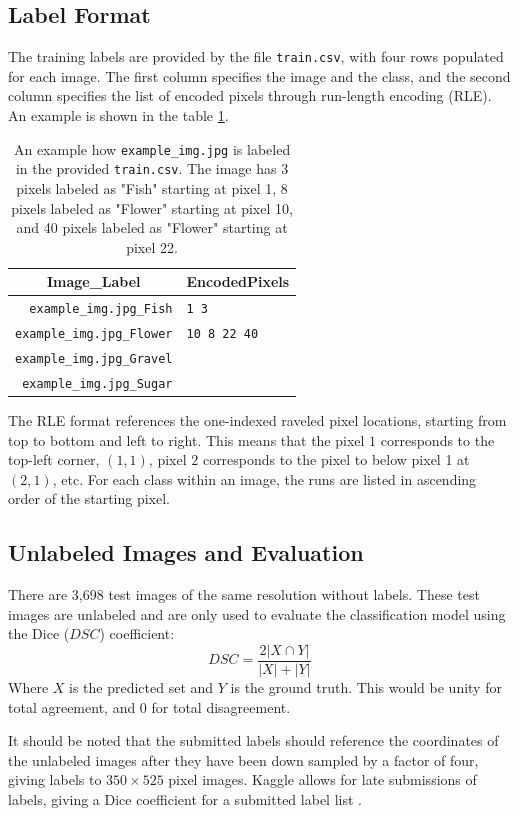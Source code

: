 \subsection*{Label Format}
The training labels are provided by the file \texttt{train.csv}, with four rows populated for each image. The first column specifies the image and the class, and the second column specifies the list of encoded pixels through run-length encoding (RLE). An example is shown in the table \cref{tab:RLE_ex}.
%
\begin{table}[h!]
    \centering
    \begin{tabular}{r|l}
    \multicolumn{1}{c|}{Image\_Label} & \multicolumn{1}{c}{EncodedPixels} \\ \hline
    \texttt{example\_img.jpg\_Fish}   & \texttt{1 3}        \\ \hline
    \texttt{example\_img.jpg\_Flower} & \texttt{10 8 22 40} \\ \hline
    \texttt{example\_img.jpg\_Gravel} &                                      \\ \hline
    \texttt{example\_img.jpg\_Sugar}  &                                     
    \end{tabular}
    \caption{An example how \texttt{example\_img.jpg} is labeled in the provided \texttt{train.csv}. The image has 3 pixels labeled as "Fish" starting at pixel 1, 8 pixels labeled as "Flower" starting at pixel 10, and 40 pixels labeled as "Flower" starting at pixel 22.}
    \label{tab:RLE_ex}
\end{table}

The RLE format references the one-indexed raveled pixel locations, starting from top to bottom and left to right. This means that the pixel \(1\) corresponds to the top-left corner, \((1,1)\), pixel \(2\) corresponds to the pixel to below pixel 1 at \((2, 1)\), etc. For each class within an image, the runs are listed in ascending order of the starting pixel. 
% 
\subsection*{Unlabeled Images and Evaluation} \label{eval}
There are 3,698 test images of the same resolution without labels. These test images are unlabeled and are only used to evaluate the classification model using the Dice (\(DSC\)) coefficient: 
%
\begin{equation*}
    DSC = \frac{2 | X \cap Y |}{|X| + |Y|}
\end{equation*}
%
Where \(X\) is the predicted set and \(Y\) is the ground truth. This would be unity for total agreement, and 0 for total disagreement. 

It should be noted that the submitted labels should reference the coordinates of the unlabeled images after they have been down sampled by a factor of four, giving labels to \(350 \times 525\) pixel images. Kaggle allows for late submissions of labels, giving a Dice coefficient for a submitted label list \cite{maxplanckinstituteformeteorology_UnderstandingCloudsSatellite_}. 